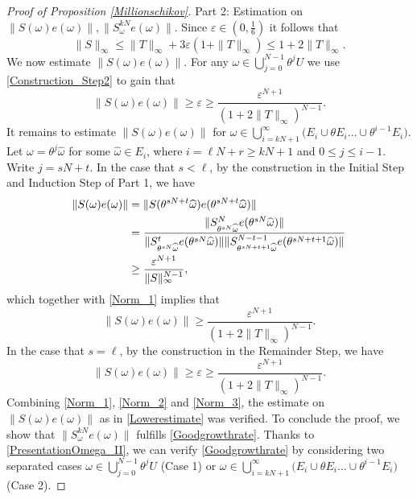 \documentclass[pdflatex,sn-mathphys-num]{sn-jnl}%
\theoremstyle{thmstyleone}%
\theoremstyle{thmstyletwo}%
\theoremstyle{thmstylethree}%
\newcommand{\eps}{\varepsilon}
\numberwithin{equation}{section}
\begin{document}
\begin{proof}[Proof of Proposition \ref{Millionschikov}]
\noindent 
Part 2: Estimation on  $\|S(\omega)e(\omega)\|, \|S^{kN}_{\omega}e(\omega)\|$. Since $\eps\in (0,\frac{1}{6})$ it follows that 
\begin{equation}\label{BoundonS}
\|S\|_{\infty}\leq \|T\|_{\infty}+3\eps(1+\|T\|_{\infty})\leq 1 +2\|T\|_{\infty}.
\end{equation}
We now estimate $\|S(\omega)e(\omega)\|$. For any $\omega\in\bigcup_{j=0}^{N-1}\theta^jU$ we use \eqref{Construction_Step2} to gain that 
\begin{equation}\label{Norm_1}
\|S(\omega)e(\omega)\|
\geq \eps \geq \frac{\eps^{N+1}}{(1+2\|T\|_{\infty})^{N-1}}.
\end{equation}
It remains to estimate $\|S(\omega)e(\omega)\|$ for $\omega\in \bigcup_{i=kN+1}^{\infty}  \Big(E_i\cup \theta E_i\dots\cup\theta^{i-1} E_i\Big)$. Let $\omega=\theta^j \widehat\omega$ for some $\widehat\omega \in E_i$, where $i=\ell N+r \geq kN+1$ and $0\leq j\leq i-1$. Write $j=sN+t$. In the case that $s<\ell$,  by the construction in the Initial Step and Induction Step of Part 1, we have  
\begin{align*}
\|S(\omega)e(\omega)\|
&=\|S(\theta^{sN+t}\widehat\omega)e(\theta^{sN+t}\widehat\omega)\|\notag\\
&=\frac{\|S^N_{\theta^{sN}\widehat\omega}e(\theta^{sN}\widehat\omega)\|}{\|S^t_{\theta^{sN}\widehat\omega}e(\theta^{sN}\widehat\omega)\|\|S^{N-t-1}_{\theta^{sN+t+1}\widehat\omega}e(\theta^{sN+t+1}\widehat\omega)\|}\notag\\
&\geq  
\frac{\eps^{N+1}}{\|S\|_{\infty}^{N-1}},
\end{align*}
which together with \eqref{Norm_1} implies that
\begin{equation}\label{Norm_2}
\|S(\omega)e(\omega)\| 
\geq \frac{\eps^{N+1}}{(1+2\|T\|_{\infty})^{N-1}}.
\end{equation}
In the case that $s=\ell$, by the construction in the Remainder Step, we have 
\begin{equation}\label{Norm_3}
\|S(\omega)e(\omega)\|
\geq \eps \geq \frac{\eps^{N+1}}{(1+2\|T\|_{\infty})^{N-1}}.
\end{equation}
Combining \eqref{Norm_1}, \eqref{Norm_2} and \eqref{Norm_3}, the estimate on $\|S(\omega)e(\omega)\|$ as in  \eqref{Lowerestimate} was verified. To conclude the proof, we show that $\|S^{kN}_{\omega}e(\omega)\|$ fulfills  \eqref{Goodgrowthrate}. Thanks to \eqref{PresentationOmega_II}, we can verify \eqref{Goodgrowthrate} by considering  two separated cases $\omega\in  \bigcup_{j=0}^{N-1}\theta^j U$ (Case 1) or $\omega\in \bigcup_{i=kN+1}^{\infty}  \Big(E_i\cup \theta E_i\dots\cup\theta^{i-1} E_i\Big)$ (Case 2).


\end{proof}
\end{document}
